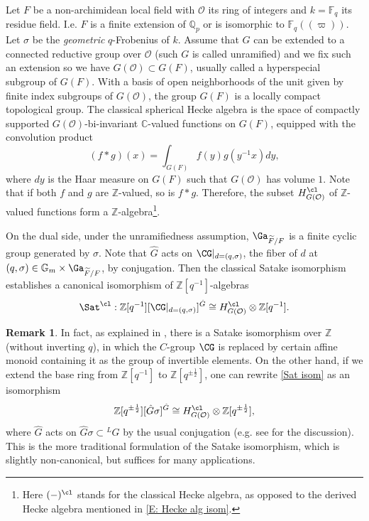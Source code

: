 \documentclass[11pt]{amsart}
\theoremstyle{definition}
\theoremstyle{definition}
\newtheorem{rmk}[thm]{Remark}
\theoremstyle{definition}
\numberwithin{equation}{section}
\newcommand{\bC}{{\mathbb C}}
\newcommand{\bF}{{\mathbb F}}
\newcommand{\bG}{{\mathbb G}}
\newcommand{\bQ}{{\mathbb Q}}
\newcommand{\bZ}{{\mathbb Z}}
\newcommand{\mO}{{\mathcal O}}
\begin{document}
Let $F$ be a non-archimidean local field with $\mO$ its ring of integers and $k=\bF_q$ its residue field. I.e. $F$ is a finite extension of $\bQ_p$ or is isomorphic to $\bF_q(\!(\varpi)\!)$.
Let $\sigma$ be the \emph{geometric} $q$-Frobenius of $k$.
Assume that $G$ can be extended to a connected reductive group over $\mO$ (such $G$ is called unramified) and we fix such an extension so we have $G(\mO)\subset G(F)$, usually called a hyperspecial subgroup of $G(F)$. With a basis of open neighborhoods of the unit given by finite index subgroups of $G(\mO)$,
the group $G(F)$ is a locally compact topological group. 
The classical spherical Hecke algebra is the space of compactly supported $G(\mO)$-bi-invariant $\bC$-valued functions on $G(F)$, equipped with the convolution product
\begin{equation}
\label{E:conv prod alge}
(f*g)(x)=\int_{G(F)}f(y)g(y^{-1}x)dy,
\end{equation}
where $dy$ is the Haar measure on $G(F)$ such that $G(\mO)$ has volume $1$.
Note that if both $f$ and $g$ are $\bZ$-valued, so is $f*g$. Therefore, the subset $H^{\cl}_{G(\mO)}$ of $\bZ$-valued functions form a $\bZ$-algebra\footnote{Here $(-)^{\cl}$ stands for the classical Hecke algebra, as opposed to the derived Hecke algebra mentioned in \eqref{E: Hecke alg isom}.}.




On the dual side,  under the unramifiedness assumption, $\Ga_{\widetilde F/F}$ is a finite cyclic group generated by $\sigma$. Note that $\hat{G}$ acts on $\CG|_{d=(q,\sigma)}$, the fiber of $d$ at $(q,\sigma)\in \bG_m\times \Ga_{\widetilde F/F}$, by conjugation.
Then the classical Satake isomorphism establishes a canonical isomorphism of $\bZ[q^{-1}]$-algebras
\begin{equation}\label{Sat isom}
\Sat^{\cl}: \bZ[q^{-1}][\CG|_{d=(q,\sigma)}]^{\hat{G}}\cong H^{\cl}_{G(\mO)}\otimes \bZ[q^{-1}].
\end{equation}

\begin{rmk}
In fact, as explained in \cite{Zhu-Integral-Satake}, there is a Satake isomorphism over $\bZ$ (without inverting $q$), in which the $C$-group $\CG$ is replaced by certain affine monoid containing it as the group of invertible elements.
On the other hand, if we extend the base ring from $\bZ[q^{-1}]$ to $\bZ[q^{\pm \frac{1}{2}}]$, one can rewrite \eqref{Sat isom} as an isomorphism 
\begin{equation}\label{Sat isom classical}
 \bZ[q^{\pm \frac{1}{2}}][\hat{G}\sigma]^{\hat{G}}\cong H^{\cl}_{G(\mO)}\otimes \bZ[q^{\pm \frac{1}{2}}],
\end{equation}
where $\hat{G}$ acts on $\hat{G}\sigma\subset {}^LG$ by the usual conjugation  (e.g. see \cite{Zhu-Integral-Satake} for the discussion).  This is the more traditional formulation of the Satake isomorphism, which is slightly non-canonical, but suffices for many applications.
\end{rmk}
\end{document}
